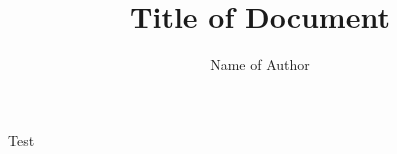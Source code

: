 \documentclass{article}
\title{Title of Document}
\author{Name of Author}
\begin{document}
\maketitle
Test
\end{document}
